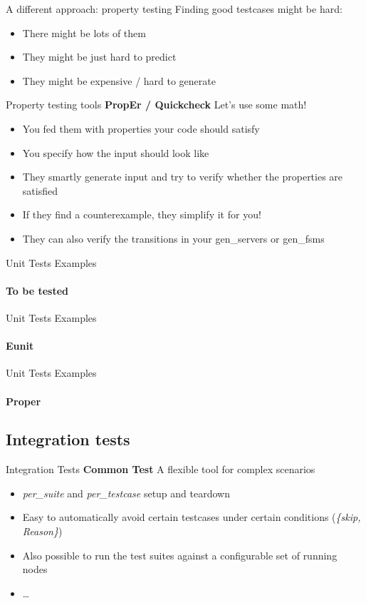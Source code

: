 \documentclass[aspectratio=169]{beamer}
\begin{document}
\begin{frame}{A different approach: property testing}
    Finding good testcases might be hard:
    \begin{itemize}
    \item There might be lots of them
    \item They might be just hard to predict
    \item They might be expensive / hard to generate
    \end{itemize}
\end{frame}

\begin{frame}{Property testing tools}
    \textbf{PropEr / Quickcheck} Let's use some math!
    \begin{itemize}
    \pause
    \item You fed them with properties your code should satisfy
    \pause
    \item You specify how the input should look like
    \pause
    \item They smartly generate input and try to verify whether the properties are satisfied
    \pause
    \item If they find a counterexample, they simplify it for you!
    \pause
    \item They can also verify the transitions in your gen\_servers or gen\_fsms
    \end{itemize}
\end{frame}

\begin{frame}{Unit Tests Examples}
    \framesubtitle{To be tested}
    
\end{frame}

\begin{frame}{Unit Tests Examples}
    \framesubtitle{Eunit}
    
\end{frame}

\begin{frame}{Unit Tests Examples}
    \framesubtitle{Proper}
    
\end{frame}

\subsection*{Integration tests}
\label{integration_tests}
\begin{frame}{Integration Tests}
    \textbf{Common Test} A flexible tool for complex scenarios
    \begin{itemize}
    \pause
    \item \emph{per\_suite} and \emph{per\_testcase} setup and teardown
    \pause
    \item Easy to automatically avoid certain testcases under certain conditions (\emph{\{skip, Reason\}})
    \pause
    \item Also possible to run the test suites against a configurable set of running nodes
    \pause
    \item \dots
    \end{itemize}
\end{frame}
\end{document}
